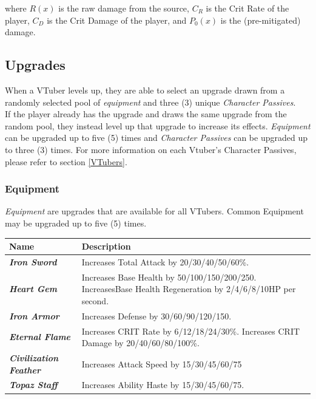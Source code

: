 \documentclass[10pt, a4paper]{article}
\begin{document}
\begin{multicols}{2}
\begin{itemize}
  	 where $R(x)$ is the raw damage from the source, $C_R$ is the Crit Rate of the player, $C_D$ is the Crit Damage of the player, and $P_0(x)$ is the (pre-mitigated) damage.
  	 
  	\end{itemize}
  	
  	\subsection{Upgrades} \label{Upgrades}
  	
  	When a VTuber levels up, they are able to select an upgrade drawn from a randomly selected pool of \textit{equipment} and three (3) unique \textit{Character Passives}. \\
  	
  	If the player already has the upgrade and draws the same upgrade from the random pool, they instead level up that upgrade to increase its effects. \textit{Equipment} can be upgraded up to five (5) times and \textit{Character Passives} can be upgraded up to three (3) times. For more information on each Vtuber's Character Passives, please refer to section \ref{VTubers}.
	
  	\subsubsection{Equipment}
  	
  	\textit{Equipment} are upgrades that are available for all VTubers. Common Equipment may be upgraded up to five (5) times.
  	
  	\begin{center}
		\begin{tabular}{|p{2.7cm}|p{5.5cm}|}
			\hline
			\textbf{Name} & \textbf{Description} \\
			\hline
			\textit{\textbf{Iron Sword}} & Increases Total Attack by 20/30/40/50/60\%. \\
			\textit{\textbf{Heart Gem}} & Increases Base Health by 50/100/150/200/250. IncreasesBase Health Regeneration by 2/4/6/8/10HP per second. \\
			\textit{\textbf{Iron Armor}} & Increases Defense by 30/60/90/120/150. \\
			\textit{\textbf{Eternal Flame}} & Increases CRIT Rate by 6/12/18/24/30\%. Increases CRIT Damage by 20/40/60/80/100\%. \\
			\textit{\textbf{Civilization Feather}} & Increases Attack Speed by 15/30/45/60/75%
			\\
			\textit{\textbf{Topaz Staff}} & Increases Ability Haste by 15/30/45/60/75.
			\\
			\hline
		\end{tabular}
	\end{center}


\end{multicols}
\end{document}
